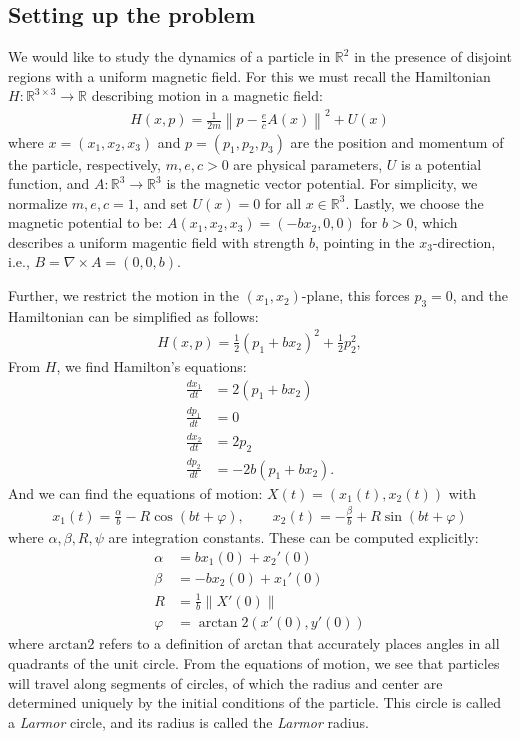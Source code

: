 \subsection{Setting up the problem}


We would like to study the dynamics of a particle in $\mathbb R^2$ in the presence of disjoint regions with a uniform magnetic field. For this we must recall the Hamiltonian $H:\mathbb R^{3\times3}\to\mathbb R$ describing motion in a magnetic field:
\begin{align*}
H(x,p)=\frac{1}{2m}\left\|p-\frac{e}{c}A(x)\right\|^2 + U(x)
\end{align*}
where $x=(x_1,x_2,x_3)$ and $p=(p_1,p_2,p_3)$ are the position and momentum of the particle, respectively, $m,e,c>0$ are physical parameters, $U$ is a potential function, and $A:\mathbb R^3\to\mathbb R^3$ is the magnetic vector potential. For simplicity, we normalize $m,e,c=1$, and set $U(x)=0$ for all $x\in \mathbb R^3$. Lastly, we choose the magnetic potential to be: $A(x_1,x_2,x_3) = (-bx_2,0,0)$ for $b>0$, which describes a uniform magentic field with strength $b$, pointing in the $x_3$-direction, i.e.,  $B=\nabla\times A=(0,0,b)$.

Further, we restrict the motion in the $(x_1,x_2)$-plane, this forces $p_3=0$, and the Hamiltonian can be simplified as follows:
\begin{align*}
H(x,p) =
\frac{1}{2}(p_1+bx_2)^2+\frac{1}{2}p_2^2,
\end{align*}
From $H$, we find Hamilton's equations:
\begin{align*}
\frac{dx_1}{dt} &= 2(p_1+bx_2)\\
\frac{dp_1}{dt} &=0\\
\frac{dx_2}{dt} &= 2p_2\\
\frac{dp_2}{dt} &=-2b(p_1+bx_2).
\end{align*}
And we can find the equations of motion: $X(t) = (x_1(t),x_2(t))$ with
\begin{align*}
x_1(t) = \frac{\alpha}{b}- R\cos(bt+\varphi),\qquad 
x_2(t) = -\frac{\beta}{b}+ R\sin(bt+\varphi)
\end{align*}
where $\alpha,\beta,R,\psi$ are integration constants. These can be computed explicitly:
\begin{align*}
\alpha &= bx_1(0)+x_2'(0)\\
\beta &= -bx_2(0)+x_1'(0)\\
R &= \frac{1}{b}\|X'(0)\|\\
\varphi &= \arctan2(x'(0),y'(0))
\end{align*}
where $\text{arctan2}$ refers to a definition of arctan that accurately places angles in all quadrants of the unit circle. From the equations of motion, we see that particles will travel along segments of circles, of which the radius and center are determined uniquely by the initial conditions of the particle. This circle is called a \textit{Larmor} circle, and its radius is called the \textit{Larmor} radius.


